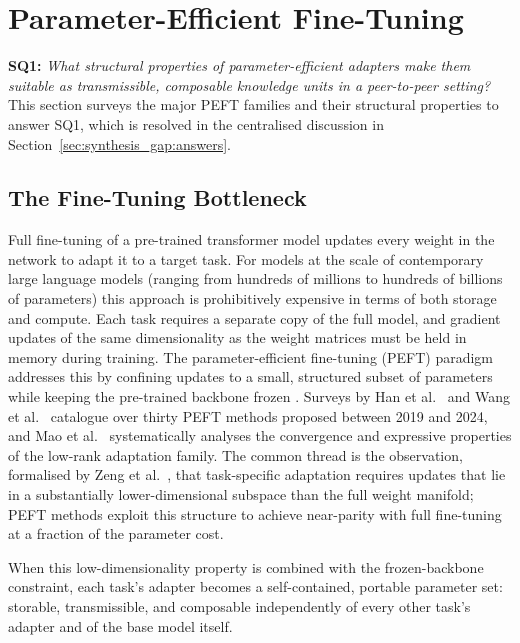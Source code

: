 \section{Parameter-Efficient Fine-Tuning}
\label{sec:peft}

\noindent\textbf{SQ1:} \textit{What structural properties of
parameter-efficient adapters make them suitable as transmissible, composable
knowledge units in a peer-to-peer setting?} This section surveys the major
PEFT families and their structural properties to answer SQ1, which is resolved
in the centralised discussion in Section~\ref{sec:synthesis_gap:answers}.

\subsection{The Fine-Tuning Bottleneck}
\label{sec:peft:intro}

Full fine-tuning of a pre-trained transformer model updates every weight in the network
to adapt it to a target task. For models at the scale of contemporary large language models (ranging from hundreds of millions to hundreds of billions of parameters)
this approach is prohibitively expensive in terms of both storage and compute. Each
task requires a separate copy of the full model, and gradient updates of the same
dimensionality as the weight matrices must be held in memory during training. The
parameter-efficient fine-tuning (PEFT) paradigm addresses this by confining updates to a
small, structured subset of parameters while keeping the pre-trained backbone frozen
\cite{DingNature2023}. Surveys by Han et al.~\cite{Han2024} and Wang et al.~\cite{WangAIReview2024}
catalogue over thirty PEFT methods proposed between 2019 and 2024, and Mao et al.~\cite{MaoLoraSurvey2024}
systematically analyses the convergence and expressive properties of the low-rank
adaptation family. The common thread is the observation, formalised by Zeng et al.~\cite{ZengExpressive2024},
that task-specific adaptation requires updates that lie in a substantially lower-dimensional
subspace than the full weight manifold; PEFT methods exploit this structure to achieve
near-parity with full fine-tuning at a fraction of the parameter cost.

When this low-dimensionality property is combined with the frozen-backbone constraint,
each task's adapter becomes a self-contained, portable parameter set: storable, transmissible,
and composable independently of every other task's adapter and of the base model itself.

